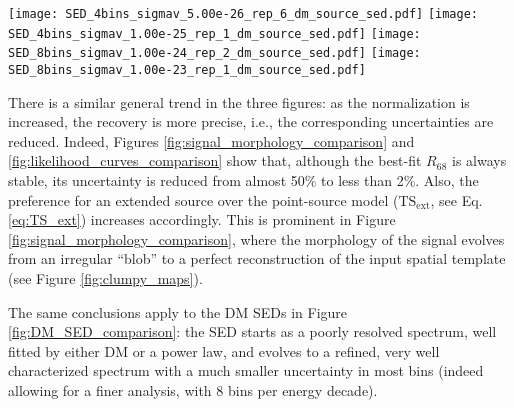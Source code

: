\documentclass[%
 reprint,
nofootinbib,
 amsmath,amssymb,
 aps,
]{revtex4-2}
\begin{document}
\begin{figure*}[!ht]
\centering
\texttt{[image: SED\_4bins\_sigmav\_5.00e-26\_rep\_6\_dm\_source\_sed.pdf]}
\texttt{[image: SED\_4bins\_sigmav\_1.00e-25\_rep\_1\_dm\_source\_sed.pdf]}
\texttt{[image: SED\_8bins\_sigmav\_1.00e-24\_rep\_2\_dm\_source\_sed.pdf]}
\texttt{[image: SED\_8bins\_sigmav\_1.00e-23\_rep\_1\_dm\_source\_sed.pdf]}
\caption{Spectral energy distribution (SED) of a 100 GeV WIMP annihilating to $b\bar{b}$, for normalization values $\mathcal{N}=5\cdot10^{-6}$ (top left), $10^{-5}$ (top right), $10^{-4}$ (bottom left), and $10^{-3}$ (bottom right). The black band is the best-fit DM spectrum with $1\sigma$ uncertainty. The analyses in the two first cases are performed with 4 bins per energy decade, while the two latter 8, as the signal is bright enough to allow a finer binning. See text for details of the analysis parameters.}
\label{fig:DM_SED_comparison}
\end{figure*}



There is a similar general trend in the three figures: as the normalization is increased, the recovery is more precise, i.e., the corresponding uncertainties are reduced. Indeed, Figures \ref{fig:signal_morphology_comparison} and \ref{fig:likelihood_curves_comparison} show that, although the best-fit $R_{68}$ is always stable, its uncertainty is reduced from almost 50\% to less than 2\%. Also, the preference for an extended source over the point-source model ($\mathrm{TS_{ext}}$, see Eq. \ref{eq:TS_ext}) increases accordingly. This is prominent in Figure \ref{fig:signal_morphology_comparison}, where the morphology of the signal evolves from an irregular
``blob'' to a perfect reconstruction of the input spatial template (see Figure \ref{fig:clumpy_maps}).

The same conclusions apply to the DM SEDs in Figure \ref{fig:DM_SED_comparison}: the SED starts as a poorly resolved spectrum, well fitted by either DM or a power law, and evolves to a refined, very well characterized spectrum with a much smaller uncertainty in most bins (indeed allowing for a finer analysis, with 8 bins per energy decade).



\end{document}
